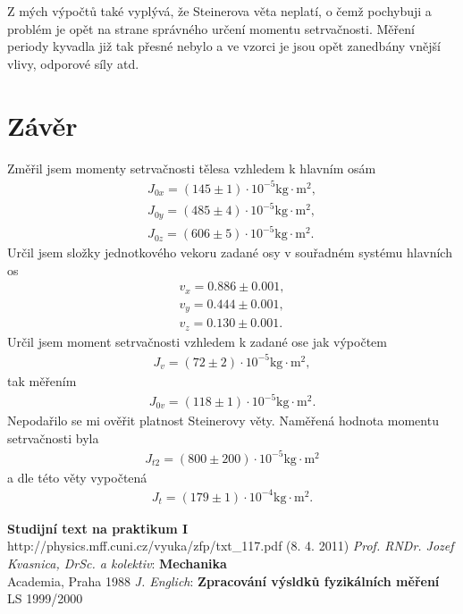 \documentclass[a4paper,12pt]{article}
\begin{document}
Z mých výpočtů také vyplývá, že Steinerova věta neplatí, o čemž pochybuji a problém je opět 
na strane správného určení momentu setrvačnosti. Měření periody kyvadla již tak přesné nebylo 
a ve vzorci je jsou opět zanedbány vnější vlivy, odporové síly atd.

\section{Závěr}
\noindent
Změřil jsem momenty setrvačnosti tělesa vzhledem k hlavním osám
\begin{eqnarray}
	J_{0x}=(145\pm1)\cdot 10^{-5} \mbox{kg}\cdot\mbox{m}^2,\\
	J_{0y}=(485\pm4)\cdot 10^{-5} \mbox{kg}\cdot\mbox{m}^2,\\
	J_{0z}=(606\pm5)\cdot 10^{-5} \mbox{kg}\cdot\mbox{m}^2.
\end{eqnarray}
Určil jsem složky jednotkového vekoru zadané osy v souřadném systému hlavních os
\begin{eqnarray}
	v_x=0.886\pm0.001,\\
	v_y=0.444\pm0.001,\\
	v_z=0.130\pm0.001.
\end{eqnarray}
Určil jsem moment setrvačnosti vzhledem k zadané ose jak výpočtem
\begin{eqnarray}
	J_{v}=(72\pm2)\cdot 10^{-5} \mbox{kg}\cdot\mbox{m}^2,
\end{eqnarray}
tak měřením
\begin{eqnarray}
	J_{0v}=(118\pm1)\cdot 10^{-5} \mbox{kg}\cdot\mbox{m}^2.
\end{eqnarray}
Nepodařilo se mi ověřit platnost Steinerovy věty. Naměřená hodnota momentu setrvačnosti byla
\begin{eqnarray}
	J_{t2}=(800\pm200)\cdot 10^{-5} \mbox{kg}\cdot\mbox{m}^2
\end{eqnarray}
a dle této věty vypočtená
\begin{eqnarray}
	J_t=(179\pm1)\cdot 10^{-4} \mbox{kg}\cdot\mbox{m}^2.
\end{eqnarray}



\begin{thebibliography}{5}
	 \textbf{Studijní text na praktikum I} \\http://physics.mff.cuni.cz/vyuka/zfp/txt\_117.pdf (8. 4. 2011)
	 \emph{Prof. RNDr. Jozef Kvasnica, DrSc. a kolektiv}: \textbf{Mechanika}\\ Academia, Praha 1988
         \emph{J. Englich}: \textbf{Zpracování výsldků fyzikálních měření} \\ LS 1999/2000
\end{thebibliography}
\end{document}
